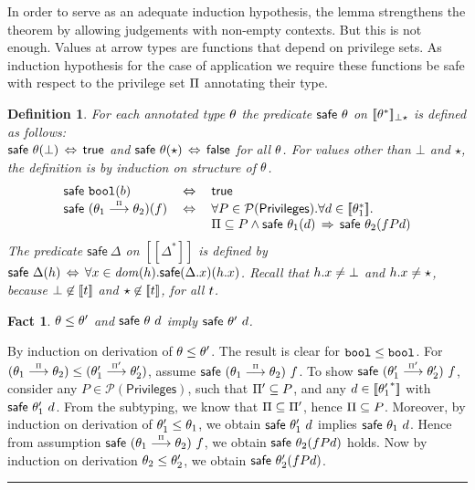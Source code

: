 \documentclass[submission,copyright,creativecommons]{eptcs}
\newcommand{\blackslug}{\rule{7pt}{7pt}}
\newcommand{\BOOL}{\mbox{\texttt{bool}}}
\renewcommand{\P}{\mathcal{P}}
\newcommand{\dom}{{\it dom}}
\newcommand{\ldb}{[\![}
\newcommand{\rdb}{]\!]}
\newcommand{\means}[1]{\ldb {#1}\rdb}
\def\lpields#1{\stackrel{#1}{\longrightarrow}}
\newcommand{\annoto}[1]{\lpields {\scriptscriptstyle #1}}
\newcommand{\PRIV}{{\mathsf{Privileges}}}
\newcommand{\safe}{\textsf{safe}}
\renewcommand{\implies}{\mathbin{\:\Rightarrow\:}}
\renewcommand{\iff}{\mathbin{\:\Leftrightarrow\:}}
\newtheorem{factx}[theorem]{Fact}
\newtheorem{definition}[theorem]{Definition}
\newenvironment{proof}{\begin{trivlist}\item[\hskip\labelsep{\bf
Proof:}]}{\blackslug\end{trivlist}}
\begin{document}
In order to serve as an adequate induction hypothesis, the lemma
strengthens the theorem by allowing judgements with non-empty
contexts.  But this is not enough.  Values at arrow types are
functions that depend on privilege sets. As induction hypothesis for
the case of application we require these functions be safe with
respect to the privilege set $\Pi$ annotating their type.

\begin{definition}
For each annotated type $\theta$ the predicate $\safe~\th$ on 
$\means{\th^*}_{\bot\star}$ is defined as follows: \\
$\safe~ {\th}(\bot) \iff \mathsf{true}$ and 
$\safe~ {\th}(\star)\iff \mathsf{false}$
for all $\theta$.  For values other than $\bot$ and $\star$, the definition is by
induction on structure of $\theta$.
\[
\begin{array}{lcl}
\safe~ {\BOOL}(b) &\iff & \mathsf{true} \\
\safe~(\th_1\annoto\Ps\th_2)(f) &\iff &
\forall P\in\P(\PRIV) .\forall d\in\means{\th_1^*} .\; \\
&&  \Ps\subseteq P \land 
\safe~ {\th_1}(d)\implies \safe~ {\th_2}(f P d)
\end{array}
\]
The predicate  
$\safe~\Delta$ on $\means{\Delta^*}$ is defined by
$ \safe~\Delta(h) \iff \forall x\in\dom(\h) . \safe(\Delta.x)(\h.x) $.
Recall that $h.x\neq\bot$ and $h.x\neq\star$, because $\bot\not\in\means{\ty}$ and
$\star\not\in\means{\ty}$, for all $t$.
\end{definition}

\begin{factx}\label{fact:safeMono}
  $\theta\leq \theta'$ and $\safe~\th~d$ imply $\safe~\th'~d$.
\end{factx}
\begin{proof}
By induction on derivation of $\theta\leq\theta'$.  The result is clear for
$\BOOL\leq\BOOL$. For $(\th_1\annoto{\Ps}\th_2)\leq(\th'_1\annoto{\Ps'}\th'_2)$,
assume $\safe~(\th_1\annoto{\Ps}\th_2)~f$. 
To show $\safe~(\th'_1\annoto{\Ps'}\th'_2)~f$, consider 
any $P\in\P(\PRIV)$, such that $\Pi'\subseteq P$, and any 
$d\in\means{{\th'_1}^*}$ with $\safe~\th'_1~d$. From the subtyping, we know
that $\Pi\subseteq\Pi'$, hence $\Pi\subseteq P$. Moreover, by induction
on derivation of $\theta'_1\leq\theta_1$, we obtain $\safe~\th'_1~d$ implies
$\safe~\th_1~d$. Hence from assumption $\safe~(\th_1\annoto{\Ps}\th_2)~f$, 
we obtain $\safe~\th_2(f P d)$ holds. Now by induction on derivation 
$\theta_2\leq\theta'_2$, we obtain $\safe~\th'_2(f P d)$.  
\end{proof}
\end{document}
